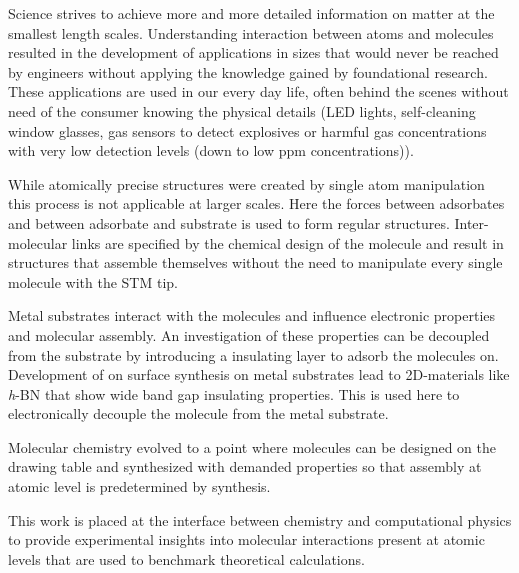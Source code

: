 Science strives to achieve more and more detailed information on matter at the smallest length scales. Understanding interaction between atoms and molecules resulted in the development of applications in sizes that would never be reached by engineers without applying the knowledge gained by foundational research. These applications are used in our every day life, often behind the scenes without need of the consumer knowing the physical details (LED lights, self-cleaning window glasses, gas sensors to detect explosives or harmful gas concentrations with very low detection levels (down to low ppm concentrations)).

While atomically precise structures were created by single atom manipulation \cite{Crommie_confinement_1993} this process is not applicable at larger scales.
Here the forces between adsorbates and between adsorbate and substrate is used to form regular structures. Inter-molecular links are specified by the chemical design of the molecule and result in structures that assemble themselves without the need to manipulate every single molecule with the STM tip.

Metal substrates interact with the molecules and influence electronic properties and molecular assembly. An investigation of these properties can be decoupled from the substrate by introducing a insulating layer to adsorb the molecules on.
Development of on surface synthesis on metal substrates lead to 2D-materials like \textit{h}-BN that show wide band gap insulating properties. This is used here to electronically decouple the molecule from the metal substrate.

Molecular chemistry evolved to a point where molecules can be designed on the drawing table and synthesized with demanded properties so that assembly at atomic level is predetermined by synthesis. 

This work is placed at the interface between chemistry and computational physics to provide experimental insights into molecular interactions present at atomic levels that are used to benchmark theoretical calculations.